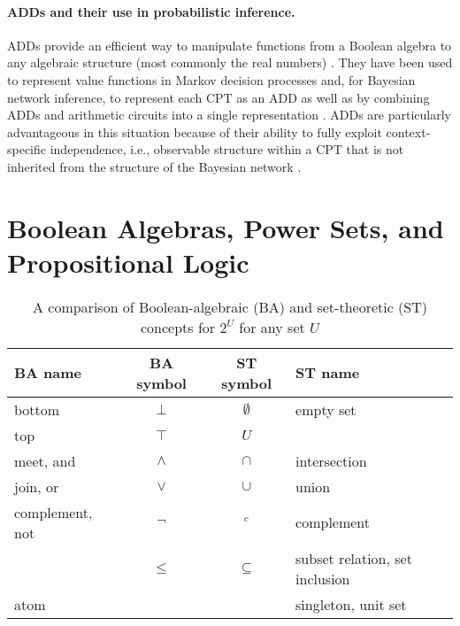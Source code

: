 \documentclass{article}
\theoremstyle{definition}
\theoremstyle{remark}
\begin{document}
\paragraph{ADDs and their use in probabilistic inference.} ADDs provide an
efficient way to manipulate functions from a Boolean algebra to any algebraic
structure (most commonly the real numbers)
\cite{DBLP:journals/fmsd/BaharFGHMPS97}. They have been used to represent value
functions in Markov decision processes \cite{DBLP:conf/uai/HoeySHB99} and, for
Bayesian network inference, to represent each CPT as an ADD
\cite{DBLP:conf/icml/ZhaoMP15} as well as by combining ADDs and arithmetic
circuits into a  single representation \cite{DBLP:conf/ijcai/ChaviraD07}. ADDs
are particularly advantageous in this situation because of their ability to
fully exploit context-specific independence, i.e., observable structure within a
CPT that is not inherited from the structure of the Bayesian network
\cite{DBLP:conf/uai/BoutilierFGK96}.

\section{Boolean Algebras, Power Sets, and Propositional
  Logic} \label{sec:prelims}

\begin{table}
  \centering
  \caption{A comparison of Boolean-algebraic (BA) and set-theoretic (ST)
    concepts for $2^U$ for any set $U$}
  \label{tbl:notation}
  \begin{tabular}{lccl}
    \toprule
    BA name & BA symbol & ST symbol & ST name \\
    \midrule
    bottom & $\bot$ & $\emptyset$ & empty set \\
    top & $\top$ & $U$ & \\
    meet, and & $\land$ & $\cap$ & intersection \\
    join, or & $\lor$ & $\cup$ & union \\
    complement, not & $\neg$ & $^c$ & complement \\
            & $\le$ & $\subseteq$ & subset relation, set inclusion \\
    atom & & & singleton, unit set \\
    \bottomrule
  \end{tabular}
\end{table}
\end{document}
